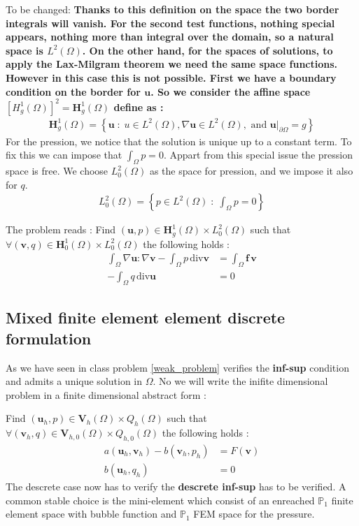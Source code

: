 \documentclass{article}
\begin{document}
To be changed:
\textbf{Thanks to this definition on the space the two border integrals will vanish.
For the second test functions, nothing special appears, nothing more than
integral over the domain, so a natural space is $L^2(\Omega)$. 
On the other hand, for the spaces of solutions, to apply the Lax-Milgram theorem we need the
same space functions. However in this case this is not possible. First we have
a boundary condition on the border for $\mathbf{u}$. So we consider the affine
space $[H^1_g(\Omega)]^2=\mathbf{H}^1_g(\Omega)$ define as :}
\begin{align*}
    \mathbf{H}^1_g(\Omega)=\left\{\mathbf{u} \;:\; u\in L^2(\Omega), \nabla \mathbf{u} \in L^2(\Omega), \textrm{ and } \mathbf{u}|_{\partial\Omega}=g \right\}
\end{align*}
For the pression, we notice that the solution is unique up to a constant term.
To fix this we can impose that $\int_\Omega p =0$. Appart from this special
issue the pression space is free. We choose $L_0^2(\Omega)$ as the space for
pression, and we impose it also for $q$.
\begin{align*}
    L^2_0(\Omega)=\left\{p\in L^2(\Omega)\; : \; \int_\Omega p =0\right\}
\end{align*}

The problem reads :
Find $(\mathbf{u},p)\in \mathbf{H}^1_g(\Omega)\times L^2_0(\Omega)$ such that
$\forall (\mathbf{v},q)\in \mathbf{H}^1_0(\Omega)\times L^2_0(\Omega)$ the
following holds :
\begin{align}
	\label{weak_problem}
	\int_{\Omega} \nabla \mathbf{u} \mathbf{:} \nabla \mathbf{v}-\int_{\Omega} p\,
	\mathrm{div}\mathbf{v} &= \int_{\Omega}\mathbf{f}\, \mathbf{v} \\
	-\int_{\Omega} q\, \mathrm{div}\mathbf{u} &= 0 \nonumber
\end{align}

\subsection*{Mixed finite element element discrete formulation}
As we have seen in class problem \ref{weak_problem} verifies the
\textbf{inf-sup} condition and admits a unique solution in $\Omega$. No we will
write the inifite dimensional problem in a finite dimensional abstract form :

Find $(\mathbf{u}_h,p)\in \mathbf{V}_h(\Omega) \times Q_h(\Omega)$ such that
$\forall (\mathbf{v}_h,q)\in \mathbf{V}_{h,0}(\Omega) \times Q_{h,0}(\Omega)$ the
following holds :
\begin{align}
	\label{pert_problem}
	a(\mathbf{u}_h,\mathbf{v}_h) - b(\mathbf{v}_h,p_h) &= F(\mathbf{v}) \\
	b(\mathbf{u}_h, q_h) &= 0 \nonumber
\end{align}
The descrete case now has to verify the \textbf{descrete inf-sup} has to be
verified. A common stable choice is the mini-element which consist of an
enreached $\mathbb{P}_1$ finite element space with bubble function and
$\mathbb{P}_1$ FEM space for the pressure.
\end{document}
